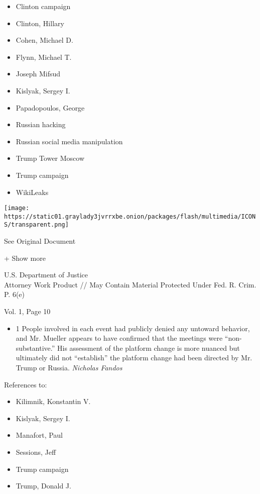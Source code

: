 \begin{itemize}
\tightlist
\item
  Clinton campaign
\item
  Clinton, Hillary
\item
  Cohen, Michael D.
\item
  Flynn, Michael T.
\item
  Joseph Mifsud
\item
  Kislyak, Sergey I.
\item
  Papadopoulos, George
\item
  Russian hacking
\item
  Russian social media manipulation
\item
  Trump Tower Moscow
\item
  Trump campaign
\item
  WikiLeaks
\end{itemize}

\protect\hyperlink{}{}

\texttt{[image: https://static01.graylady3jvrrxbe.onion/packages/flash/multimedia/ICONS/transparent.png]}

See Original Document

+ Show more

U.S. Department of Justice\\
Attorney Work Product // May Contain Material Protected Under Fed. R.
Crim. P. 6(e)

Vol. 1, Page 10

\begin{itemize}
\tightlist
\item
  1 People involved in each event had publicly denied any untoward
  behavior, and Mr. Mueller appears to have confirmed that the meetings
  were ``non-substantive.'' His assessment of the platform change is
  more nuanced but ultimately did not ``establish'' the platform change
  had been directed by Mr. Trump or Russia. \emph{Nicholas Fandos}
\end{itemize}

References to:

\begin{itemize}
\tightlist
\item
  Kilimnik, Konstantin V.
\item
  Kislyak, Sergey I.
\item
  Manafort, Paul 
\item
  Sessions, Jeff
\item
  Trump campaign
\item
  Trump, Donald J.
\end{itemize}

